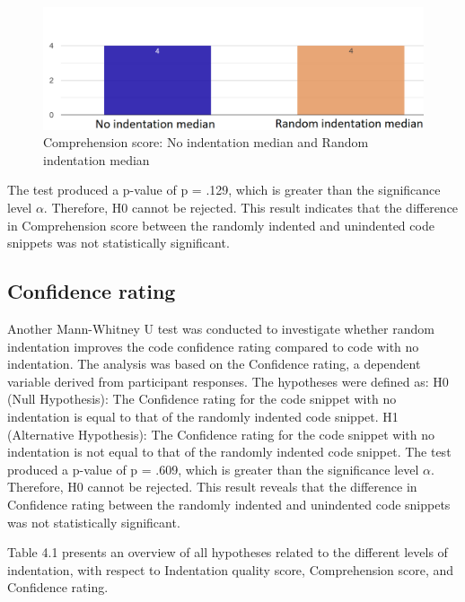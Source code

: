 \begin{figure} [H]
  \centering
  \includegraphics[scale=0.55]{figures/0-r-q3.png}
  \caption{Comprehension score:  No indentation median and Random indentation median}
  \label{fig:AnhangsChor}
\end{figure}

The test produced a p-value of p = .129, which is greater than the significance level \(\alpha\). Therefore, H0 cannot be rejected. This result indicates that the difference in Comprehension score between the randomly indented and unindented code snippets was not statistically significant.


\subsection{Confidence rating}

Another Mann-Whitney U test was conducted to investigate whether random indentation improves the code confidence rating compared to code with no indentation. The analysis was based on the Confidence rating, a dependent variable derived from participant responses. The hypotheses were defined as: H0 (Null Hypothesis): The Confidence rating for the code snippet with no indentation is equal to that of the randomly indented code snippet. H1 (Alternative Hypothesis): The Confidence rating for the code snippet with no indentation is not equal to that of the randomly indented code snippet.
The test produced a p-value of p = .609, which is greater than the significance level \(\alpha\). Therefore, H0 cannot be rejected. This result reveals that the difference in Confidence rating between the randomly indented and unindented code snippets was not statistically significant.  



Table 4.1 presents an overview of all hypotheses related to the different levels of indentation, with respect to Indentation quality score, Comprehension score, and Confidence rating.

